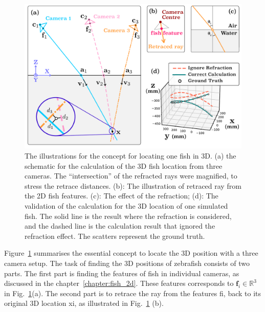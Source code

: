 \documentclass[11pt,twoside]{report}
\begin{document}
\begin{figure}
    \centering
    \includegraphics[width=\linewidth]{locate-one}
    \caption[The concept of tracking one fish in 3D]{\label{fig:locate-one}
        The illustrations for the concept for locating one fish in 3D.
        (a) the schematic for the calculation of the 3D fish location from three cameras. The ``intersection'' of the refracted rays were magnified, to stress the retrace distances.
        (b): The illustration of retraced ray from the 2D fish features.
        (c): The effect of the refraction;
        (d): The validation of the calculation for the 3D location of one simulated fish. The solid line is the result where the refraction is considered, and the dashed line is the calculation result that ignored the refraction effect. The scatters represent the ground truth.
    }
\end{figure}



Figure~\ref{fig:locate-one} summarises the essential concept to locate the 3D position with a three camera setup. 
The task of finding the 3D positions of zebrafish consists of two parts. The first part is finding the features of fish in individual cameras, as discussed in the chapter~\ref{chapter:fish_2d}. These features corresponds to $\mathbf{f}_i \in \mathbb{R}^3$ in Fig.~\ref{fig:locate-one}(a).
The second part is to retrace the ray from the features \gls{fi}, back to its original 3D location \gls{xi}, as illustrated in Fig.~\ref{fig:locate-one} (b).
\end{document}
